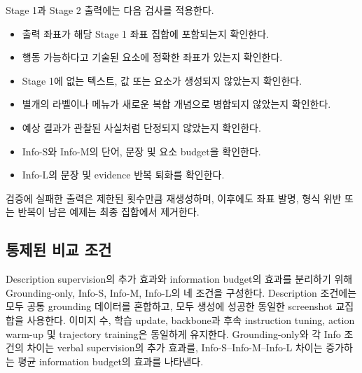 Stage 1과 Stage 2 출력에는 다음 검사를 적용한다.
\begin{itemize}
    \item 출력 좌표가 해당 Stage 1 좌표 집합에 포함되는지 확인한다.
    \item 행동 가능하다고 기술된 요소에 정확한 좌표가 있는지 확인한다.
    \item Stage 1에 없는 텍스트, 값 또는 요소가 생성되지 않았는지
          확인한다.
    \item 별개의 라벨이나 메뉴가 새로운 복합 개념으로 병합되지
          않았는지 확인한다.
    \item 예상 결과가 관찰된 사실처럼 단정되지 않았는지 확인한다.
    \item Info-S와 Info-M의 단어, 문장 및 요소 budget을 확인한다.
    \item Info-L의 문장 및 evidence 반복 퇴화를 확인한다.
\end{itemize}
검증에 실패한 출력은 제한된 횟수만큼 재생성하며, 이후에도 좌표 발명,
형식 위반 또는 반복이 남은 예제는 최종 집합에서 제거한다.

\subsection{통제된 비교 조건}

Description supervision의 추가 효과와 information budget의 효과를
분리하기 위해 Grounding-only, Info-S, Info-M, Info-L의 네 조건을
구성한다. Description 조건에는 모두 공통 grounding 데이터를 혼합하고,
모두 생성에 성공한 동일한 screenshot 교집합을 사용한다. 이미지 수,
학습 update, backbone과 후속 instruction tuning, action warm-up 및
trajectory training은 동일하게 유지한다. Grounding-only와 각 Info
조건의 차이는 verbal supervision의 추가 효과를, Info-S--Info-M--Info-L
차이는 증가하는 평균 information budget의 효과를 나타낸다.
